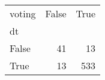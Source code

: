 \begin{tabular}{lrr}
\toprule
voting &  False &  True  \\
dt    &        &        \\
\midrule
False &     41 &     13 \\
True  &     13 &    533 \\
\bottomrule
\end{tabular}

